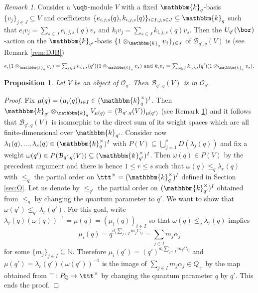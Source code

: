 \documentclass[11pt]{amsart}
\newtheorem{prop}[theorem]{Proposition}
\theoremstyle{definition}
\theoremstyle{remark}
\newtheorem{rem}[theorem]{Remark}
\numberwithin{equation}{section}
\begin{document}
\begin{rem}\label{rem:BVact} Consider a $\uqb$-module $V$ with a fixed $\mathbbm{k}_q$-basis $\{v_j\}_{j\in J}\subseteq V$ and coefficients $\{e_{i,j,s}(q),k_{i,j,s}(q)\}_{i\in I, j,s \in J} \subseteq \mathbbm{k}_q$ such that 
$\textstyle e_i v_j = \sum_{s\in J} e_{i,j,s}(q) v_s \text{ and } k_i v_j = \sum_{s\in J} k_{i,j,s}(q) v_s.$
Then the $U_{q'}(\bor)$-action on the $\mathbbm{k}_{q'}$-basis $\{1\otimes_{\mathbbm{k}_q}v_j\}_{j\in J}$ of $\mathcal{B}_{q',q}(V)$ is (see Remark \ref{rem:DJB})
$$\textstyle e_i (1\otimes_{\mathbbm{k}_q} v_j) = \sum_{s\in J} e_{i,j,s}(q') (1\otimes_{\mathbbm{k}_q} v_s) \text{ and } k_i v_j = \sum_{s\in J} k_{i,j,s}(q') (1\otimes_{\mathbbm{k}_q} v_s).$$
\end{rem}
\begin{prop} Let $V$ be an object of $\mathcal{O}_q$. Then $\mathcal{B}_{q',q}(V)$ is in $\mathcal{O}_{q'}$.
\end{prop}
\begin{proof}
Fix $\mu(q) = (\mu_i(q))_{i\in I}\in (\mathbbm{k}_q^{\times})^{I}$. Then $\mathbbm{k}_{q'}\otimes_{\mathbbm{k}_q}V_{\mu(q)} =(\mathcal{B}_{q',q}(V))_{\mu(q')}$ (see Remark \ref{rem:BVact}) and it follows that $\mathcal{B}_{q',q}(V)$ is isomorphic to the direct sum of its weight spaces which are all finite-dimensional over $\mathbbm{k}_{q'}$. Consider now $\lambda_1(q),...,\lambda_s(q) \in (\mathbbm{k}_q^{\times})^{I}$ with $P(V) \subseteq \bigcup_{j=1}^s D(\lambda_j(q))$ and fix a weight $\omega(q') \in P(\mathcal{B}_{q',q}(V))\subseteq (\mathbbm{k}_{q'}^{\times})^{I}$. Then $\omega(q) \in P(V)$ by the precedent argument and there is hence $1\leq r\leq s$ such that $\omega(q)\leq_q \lambda_r(q)$ with $\leq_q$ the partial order on $\ttt^{\times} = (\mathbbm{k}_q^{\times})^I$ defined in Section \ref{sec:O}. Let us denote by $\leq_{q'}$ the partial order on $(\mathbbm{k}_{q'}^{\times})^{I}$ obtained from $\leq_q$ by changing the quantum parameter to $q'$. We want to show that $\omega(q')\leq_{q'} \lambda_r(q')$. For this goal, write $\lambda_r(q)(\omega(q))^{-1} =\mu(q) = (\mu_i(q))_{i\in I}$ so that $\omega(q)\leq_q \lambda_r(q)$ implies $$ \textstyle \mu_i(q) = q^{d_i\sum_{j\in I} m_j C_{ij}} = \overline{\sum_{j\in I}m_j\alpha_j}$$
for some $\{m_j\}_{j\in I}\subseteq \mathbb{N}$. Therefore $ \mu_i(q') = (q')^{d_i\sum_{j\in I} m_j C_{ij}}$ and $\mu(q')=\lambda_r(q')(\omega(q'))^{-1}$ is the image of $\sum_{j\in I}m_j\alpha_j \in Q_+$ by the map obtained from $\overline{\textcolor{white}{\alpha}} : P_{\mathbb{Q}} \rightarrow \ttt^{\times}$ by changing the quantum parameter $q$ by $q'$. This ends the proof.
\end{proof} 
\end{document}
